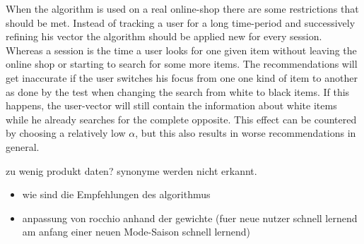 \noindent
When the algorithm is used on a real online-shop there are some restrictions that should be met.
Instead of tracking a user for a long time-period and successively refining his vector the algorithm should be applied new for every session.
Whereas a session is the time a user looks for one given item without leaving the online shop or starting to search for some more items.
The recommendations will get inaccurate if the user switches his focus from one one kind of item to another as done by the test when changing the search from white to black items.
If this happens, the user-vector will still contain the information about white items while he already searches for the complete opposite.
This effect can be countered by choosing a relatively low $\alpha$, but this also results in worse recommendations in general.







{
\color{red}
zu wenig produkt daten?
synonyme werden nicht erkannt.

}












{\color{red}
    \begin{itemize}
        \item wie sind die Empfehlungen des algorithmus
        \item anpassung von rocchio anhand der gewichte (fuer neue nutzer schnell lernend am anfang einer neuen Mode-Saison schnell lernend)
    \end{itemize}
}

